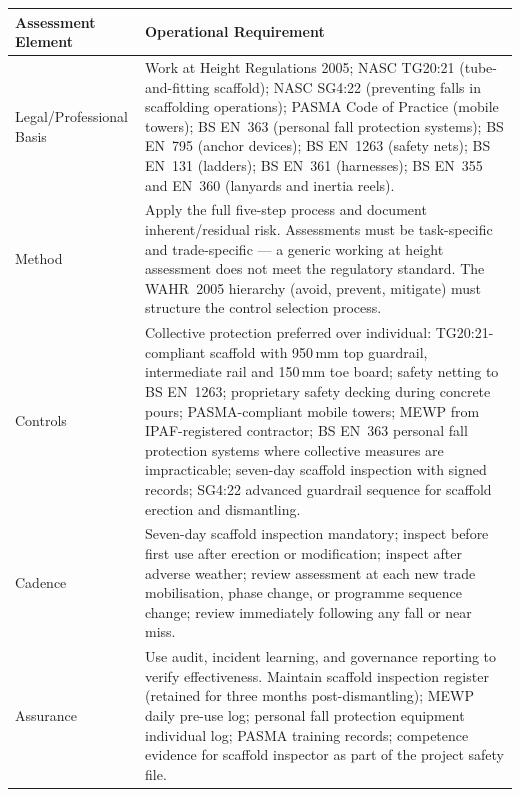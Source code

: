 \begin{table}[H]
\centering
\begin{tabularx}{\textwidth}{>{\raggedright\arraybackslash}p{3.2cm}X}
\toprule
\textbf{Assessment Element} & \textbf{Operational Requirement} \\
\midrule
Legal/Professional Basis & Work at Height Regulations 2005; NASC TG20:21 (tube-and-fitting scaffold); NASC SG4:22 (preventing falls in scaffolding operations); PASMA Code of Practice (mobile towers); BS EN~363 (personal fall protection systems); BS EN~795 (anchor devices); BS EN~1263 (safety nets); BS EN~131 (ladders); BS EN~361 (harnesses); BS EN~355 and EN~360 (lanyards and inertia reels). \\
Method & Apply the full five-step process and document inherent/residual risk. Assessments must be task-specific and trade-specific --- a generic working at height assessment does not meet the regulatory standard. The WAHR~2005 hierarchy (avoid, prevent, mitigate) must structure the control selection process. \\
Controls & Collective protection preferred over individual: TG20:21-compliant scaffold with 950\,mm top guardrail, intermediate rail and 150\,mm toe board; safety netting to BS EN~1263; proprietary safety decking during concrete pours; PASMA-compliant mobile towers; MEWP from IPAF-registered contractor; BS EN~363 personal fall protection systems where collective measures are impracticable; seven-day scaffold inspection with signed records; SG4:22 advanced guardrail sequence for scaffold erection and dismantling. \\
Cadence & Seven-day scaffold inspection mandatory; inspect before first use after erection or modification; inspect after adverse weather; review assessment at each new trade mobilisation, phase change, or programme sequence change; review immediately following any fall or near miss. \\
Assurance & Use audit, incident learning, and governance reporting to verify effectiveness. Maintain scaffold inspection register (retained for three months post-dismantling); MEWP daily pre-use log; personal fall protection equipment individual log; PASMA training records; competence evidence for scaffold inspector as part of the project safety file. \\
\bottomrule
\end{tabularx}
\end{table}

